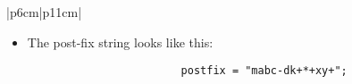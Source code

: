 \begin{center}
\begin{longtable}{ |p{6cm}|p{11cm}| }
\begin{itemize}
{\begin{center}
\begin{verbatim}
                            pop(&OperandStack);
                        \end{verbatim}
                        \begin{tabular}{ c }
                            \texttt{OperandStack =} \\ \\
                        \end{tabular}
                        \begin{bytefield}{10}
                             \\
                        \end{bytefield}
                    \end{center}
                }
            
            \item The post-fix string looks like this:
                {
                    \begin{verbatim}
                        postfix = "mabc-dk+*+xy+";
                    \end{verbatim}
                }
        \end{itemize}
        \\ 
        \hline
        \hline
        
         \\
        \hline 
        \hline
        

\end{longtable}
\end{center}
